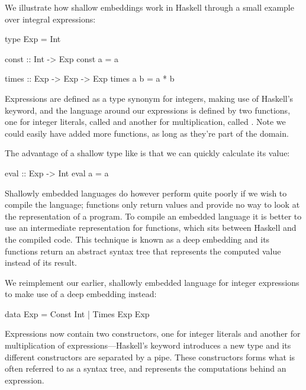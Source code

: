 \documentclass[../main.tex]{subfiles}
\begin{document}
We illustrate how shallow embeddings work in Haskell through a small example over integral expressions:

\begin{code}
type Exp = Int

const :: Int -> Exp
const a = a

times :: Exp -> Exp -> Exp
times a b = a * b
\end{code}

\noindent Expressions are defined as a type synonym for integers, making use of Haskell's  keyword, and the language around our expressions is defined by two functions, one for integer literals, called  and another for multiplication, called . Note we could easily have added more functions, as long as they're part of the domain.


The advantage of a shallow type like  is that we can quickly calculate its value:

\begin{code}
eval :: Exp -> Int
eval a = a
\end{code}

\noindent Shallowly embedded languages do however perform quite poorly if we wish to compile the language; functions only return values and provide no way to look at the representation of a program. To compile an embedded language it is better to use an intermediate representation for functions, which sits between Haskell and the compiled code. This technique is known as a deep embedding and its functions return an abstract syntax tree that represents the computed value instead of its result.

We reimplement our earlier, shallowly embedded language for integer expressions to make use of a deep embedding instead:

\begin{code}
data Exp = Const Int | Times Exp Exp
\end{code}

\noindent Expressions now contain two constructors, one for integer literals and another for multiplication of expressions---Haskell's  keyword introduces a new type and its different constructors are separated by a pipe. These constructors forms what is often referred to as a syntax tree, and represents the computations behind an expression.
\end{document}
